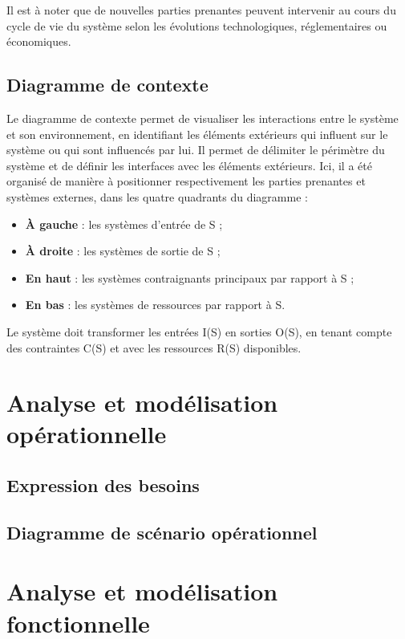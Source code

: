 \documentclass{article}
\begin{document}
Il est à noter que de nouvelles parties prenantes peuvent intervenir au cours du cycle de vie du système selon les évolutions technologiques, réglementaires ou économiques. 
\subsection{Diagramme de contexte} 

Le diagramme de contexte permet de visualiser les interactions entre le système et son environnement, en identifiant les éléments extérieurs qui influent sur le système ou qui sont influencés par lui. Il permet de délimiter le périmètre du système et de définir les interfaces avec les éléments extérieurs. Ici, il a été organisé de manière à positionner respectivement les parties prenantes et systèmes externes, dans les quatre quadrants du diagramme :
\begin{itemize}
    \item \textbf{À gauche} : les systèmes d'entrée de S ;
    \item \textbf{À droite} : les systèmes de sortie de S ;
    \item \textbf{En haut} : les systèmes contraignants principaux par rapport à S ;
    \item \textbf{En bas} : les systèmes de ressources par rapport à S.
\end{itemize}
Le système doit transformer les entrées I(S) en sorties O(S), en tenant compte des contraintes C(S) et avec les ressources R(S) disponibles.  



\section{Analyse et modélisation opérationnelle}
\subsection{Expression des besoins}

\subsection{Diagramme de scénario opérationnel}


\section{Analyse et modélisation fonctionnelle}
\end{document}
